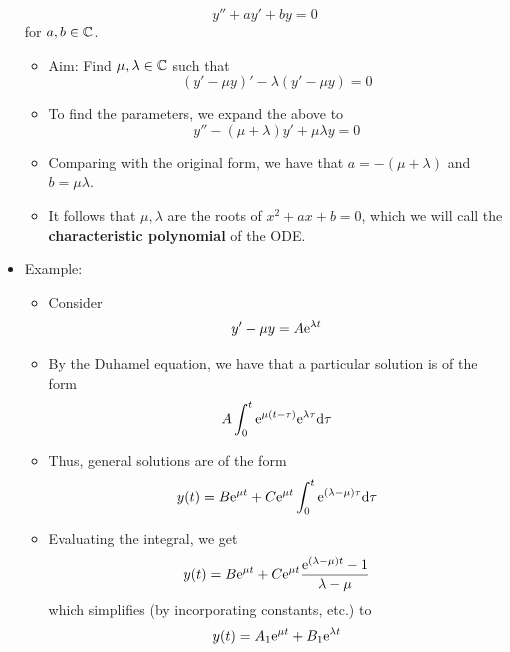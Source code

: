 \documentclass[../notes.tex]{subfiles}
\begin{document}
\begin{itemize}
\begin{equation*}
        y''+ay'+by = 0
    \end{equation*}
    for $a,b\in\C$.
    \begin{itemize}
        \item Aim: Find $\mu,\lambda\in\C$ such that
        \begin{equation*}
            (y'-\mu y)'-\lambda(y'-\mu y) = 0
        \end{equation*}
        \item To find the parameters, we expand the above to
        \begin{equation*}
            y''-(\mu+\lambda)y'+\mu\lambda y = 0
        \end{equation*}
        \item Comparing with the original form, we have that $a=-(\mu+\lambda)$ and $b=\mu\lambda$.
        \item It follows that $\mu,\lambda$ are the roots of $x^2+ax+b=0$, which we will call the \textbf{characteristic polynomial} of the ODE.
    \end{itemize}
    \item Example:
    \begin{itemize}
        \item Consider
        \begin{equation*}
            y'-\mu y = A\e[\lambda t]
        \end{equation*}
        \item By the Duhamel equation, we have that a particular solution is of the form
        \begin{equation*}
            A\int_0^t\e[\mu(t-\tau)]\e[\lambda\tau]\dd\tau
        \end{equation*}
        \item Thus, general solutions are of the form
        \begin{equation*}
            y(t) = B\e[\mu t]+C\e[\mu t]\int_0^t\e[(\lambda-\mu)\tau]\dd\tau
        \end{equation*}
        \item Evaluating the integral, we get
        \begin{equation*}
            y(t) = B\e[\mu t]+C\e[\mu t]\frac{\e[(\lambda-\mu)t]-1}{\lambda-\mu}
        \end{equation*}
        which simplifies (by incorporating constants, etc.) to
        \begin{equation*}
            y(t) = A_1\e[\mu t]+B_1\e[\lambda t]
        \end{equation*}

\end{itemize}
\end{itemize}
\end{document}

